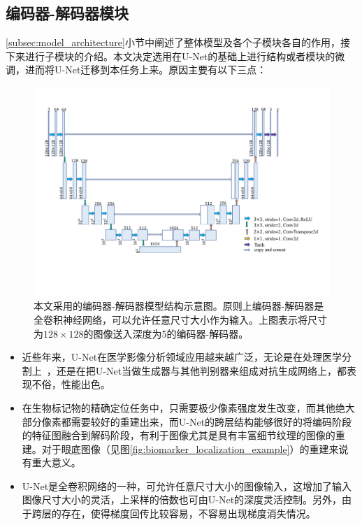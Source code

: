 \subsection{编码器-解码器模块}\label{subsec:encoder_decoder_model}
\ref{subsec:model_architecture}小节中阐述了整体模型及各个子模块各自的作用，接下来进行子模块的介绍。本文决定选用在U-Net的基础上进行结构或者模块的微调，进而将U-Net迁移到本任务上来。原因主要有以下三点：
\begin{figure}[h]
	\centering
	\includegraphics[width=1.0\textwidth]{figure/auto_encoder_architecture}
	\caption{本文采用的编码器-解码器模型结构示意图。原则上编码器-解码器是全卷积神经网络，可以允许任意尺寸大小作为输入。上图表示将尺寸为$128\times 128$的图像送入深度为5的编码器-解码器。}
	\label{fig:auto_encoder_architecture}
\end{figure}
\begin{itemize}
	\item 近些年来，U-Net在医学影像分析领域应用越来越广泛，无论是在处理医学分割上~\cite{oktay2018attention, dong2017automatic, zhang2018ct}，还是在把U-Net当做生成器与其他判别器来组成对抗生成网络上，都表现不俗，性能出色。
	\item 在生物标记物的精确定位任务中，只需要极少像素强度发生改变，而其他绝大部分像素都需要较好的重建出来，而U-Net的跨层结构能够很好的将编码阶段的特征图融合到解码阶段，有利于图像尤其是具有丰富细节纹理的图像的重建。对于眼底图像（见图\ref{fig:biomarker_localization_example}）的重建来说有重大意义。
	\item U-Net是全卷积网络的一种，可允许任意尺寸大小的图像输入，这增加了输入图像尺寸大小的灵活，上采样的倍数也可由U-Net的深度灵活控制。另外，由于跨层的存在，使得梯度回传比较容易，不容易出现梯度消失情况。
\end{itemize}
